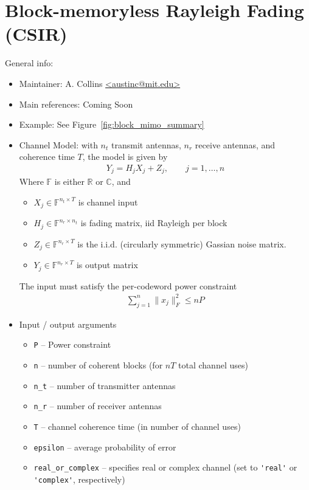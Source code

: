 \documentclass[a4paper,11p]{memoir}
\begin{document}
%
%
%
%

\chapter{Block-memoryless Rayleigh Fading (CSIR)}

General info:
\begin{itemize}
\item Maintainer: A. Collins \url{<austinc@mit.edu>}

\item Main references: Coming Soon

\item Example: See Figure~\ref{fig:block_mimo_summary}

\item Channel Model: with $n_t$ transmit antennas, $n_r$ receive antennas, and coherence time $T$, the model is given by
\begin{align*}
Y_j = H_jX_j + Z_j, \qquad j = 1,\hdots,n
\end{align*}
Where $\mathbb{F}$ is either $\mathbb{R}$ or $\mathbb{C}$, and
\begin{itemize}
\item $X_j \in \mathbb{F}^{n_t \times T}$ is channel input
\item $H_j \in \mathbb{F}^{n_r \times n_t}$ is fading matrix, iid Rayleigh per block
\item $Z_j \in \mathbb{F}^{n_r \times T}$ is the i.i.d. (circularly symmetric) Gassian noise matrix.
\item $Y_j \in \mathbb{F}^{n_r \times T}$ is output matrix
\end{itemize}
The input must satisfy the per-codeword power constraint
\begin{align*}
\sum_{j=1}^n \|x_j\|_F^2 \leq nP
\end{align*}

\item Input / output arguments
\begin{itemize}
\item \verb|P| -- Power constraint
\item \verb|n| -- number of coherent blocks (for $nT$ total channel uses)
\item \verb|n_t| -- number of transmitter antennas
\item \verb|n_r| -- number of receiver antennas
\item \verb|T| -- channel coherence time (in number of channel uses)
\item \verb|epsilon| -- average probability of error
\item \verb|real_or_complex| -- specifies real or complex channel (set to \verb|'real'| or \verb|'complex'|, respectively)
\end{itemize}
\end{itemize}
\end{document}
